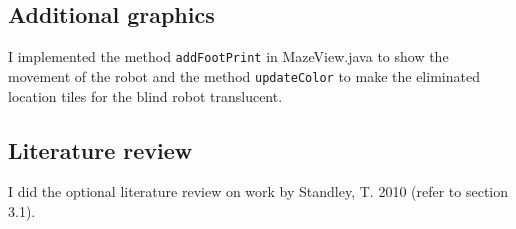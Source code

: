 \documentclass[9.5pt]{extarticle}
\begin{document}
\subsection{Additional graphics}

I implemented the method \verb`addFootPrint` in MazeView.java to show the movement of the robot and the method \verb`updateColor` to make the eliminated location tiles for the blind robot translucent.

\subsection{Literature review}

I did the optional literature review on work by Standley, T. 2010 (refer to section 3.1).
\end{document}
